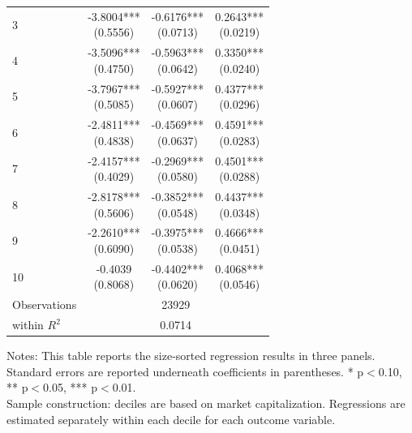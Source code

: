 \begin{table}[!htbp]
\begin{threeparttable}
\begin{minipage}[t]{0.56\textwidth}
\begin{subtable}[t]{\linewidth}
\begin{tabular}{@{}lccc@{}}
3 & \shortstack{-3.8004***\\(0.5556)} & \shortstack{-0.6176***\\(0.0713)} & \shortstack{0.2643***\\(0.0219)} \\
4 & \shortstack{-3.5096***\\(0.4750)} & \shortstack{-0.5963***\\(0.0642)} & \shortstack{0.3350***\\(0.0240)} \\
5 & \shortstack{-3.7967***\\(0.5085)} & \shortstack{-0.5927***\\(0.0607)} & \shortstack{0.4377***\\(0.0296)} \\
6 & \shortstack{-2.4811***\\(0.4838)} & \shortstack{-0.4569***\\(0.0637)} & \shortstack{0.4591***\\(0.0283)} \\
7 & \shortstack{-2.4157***\\(0.4029)} & \shortstack{-0.2969***\\(0.0580)} & \shortstack{0.4501***\\(0.0288)} \\
8 & \shortstack{-2.8178***\\(0.5606)} & \shortstack{-0.3852***\\(0.0548)} & \shortstack{0.4437***\\(0.0348)} \\
9 & \shortstack{-2.2610***\\(0.6090)} & \shortstack{-0.3975***\\(0.0538)} & \shortstack{0.4666***\\(0.0451)} \\
10 & \shortstack{-0.4039\\(0.8068)} & \shortstack{-0.4402***\\(0.0620)} & \shortstack{0.4068***\\(0.0546)} \\
\midrule
Observations & \multicolumn{3}{c}{23929} \\
within $R^2$ & \multicolumn{3}{c}{0.0714} \\
\bottomrule
\end{tabular}
\end{subtable}
\end{minipage}
\vspace{0.35em}
\noindent\parbox{\textwidth}{\footnotesize
Notes: This table reports the size-sorted regression results in three panels. Standard errors are reported underneath coefficients in parentheses. * p$<$0.10, ** p$<$0.05, *** p$<$0.01.\\
Sample construction: deciles are based on market capitalization. Regressions are estimated separately within each decile for each outcome variable.
}
\end{threeparttable}
\end{table}
